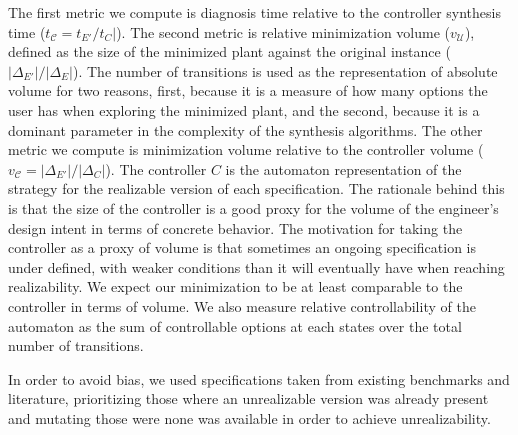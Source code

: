 The first metric we compute is diagnosis time relative to the controller synthesis time ($t_{\mathcal{C}}=t_{E'}/t_{C}|$). The second metric is relative minimization volume ($v_{\mathcal{U}}$), defined as the size of the minimized plant against the original instance ($|\Delta_{E'}|/|\Delta_{E}|$). 
The number of transitions is used as the representation of absolute volume for two reasons, first, because it is a measure of how many options the user has when exploring the minimized plant, and the  second, because it is a dominant parameter in the complexity of the synthesis algorithms. 
The other metric we compute is minimization volume relative to the controller volume ($v_{\mathcal{C}}=|\Delta_{E'}|/|\Delta_{C}|$). The controller $C$ is the automaton representation of the strategy for the realizable version of each specification. The rationale behind this is that the size of the controller is a good proxy for the volume of the engineer's design intent in terms of concrete behavior. The motivation for taking the controller as a proxy of volume is that sometimes an ongoing specification is under defined, with weaker conditions than it will eventually have when reaching realizability. We expect our minimization to be at least comparable to the controller in terms of volume. We also measure relative controllability of the automaton as the sum of controllable options at each states over the total number of transitions. 

In order to avoid bias, we used specifications taken from existing benchmarks and literature, prioritizing those where an unrealizable version was already present and mutating those were none was available in order to achieve unrealizability. 

